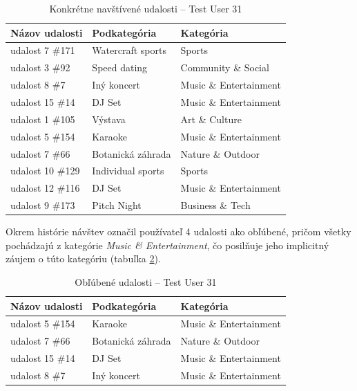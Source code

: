 \begin{table}[H]
\centering
\caption{Konkrétne navštívené udalosti – Test User 31}
\label{tab:eventy_u31}
\small
\begin{tabular}{|l|l|l|}
\hline
\textbf{Názov udalosti} & \textbf{Podkategória} & \textbf{Kategória} \\ \hline
udalost 7 \#171  & Watercraft sports         & Sports \\
udalost 3 \#92   & Speed dating              & Community \& Social \\
udalost 8 \#7    & Iný koncert               & Music \& Entertainment \\
udalost 15 \#14  & DJ Set                    & Music \& Entertainment \\
udalost 1 \#105  & Výstava                   & Art \& Culture \\
udalost 5 \#154  & Karaoke                   & Music \& Entertainment \\
udalost 7 \#66   & Botanická záhrada         & Nature \& Outdoor \\
udalost 10 \#129 & Individual sports         & Sports \\
udalost 12 \#116 & DJ Set                    & Music \& Entertainment \\
udalost 9 \#173  & Pitch Night               & Business \& Tech \\ \hline
\end{tabular}
\end{table}

Okrem histórie návštev označil používateľ 4 udalosti ako obľúbené, pričom všetky pochádzajú z kategórie \textit{Music \& Entertainment}, čo posilňuje jeho implicitný záujem o túto kategóriu (tabuľka \ref{tab:oblubene_u31}).

\begin{table}[H]
\centering
\caption{Obľúbené udalosti – Test User 31}
\label{tab:oblubene_u31}
\begin{tabular}{|l|l|l|}
\hline
\textbf{Názov udalosti} & \textbf{Podkategória} & \textbf{Kategória} \\ \hline
udalost 5 \#154  & Karaoke           & Music \& Entertainment \\
udalost 7 \#66   & Botanická záhrada & Nature \& Outdoor \\
udalost 15 \#14  & DJ Set            & Music \& Entertainment \\
udalost 8 \#7    & Iný koncert       & Music \& Entertainment \\ \hline
\end{tabular}
\end{table}

